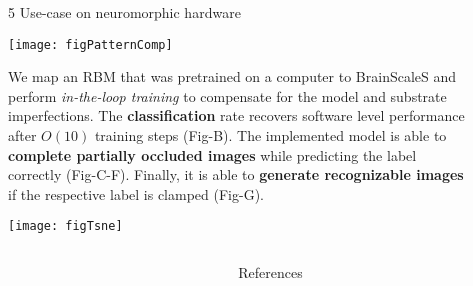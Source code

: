 \begin{frame}
\begin{columns}
\begin{column}{0.99\textwidth}
\begin{columns}[t]
\begin{column}{0.32\textwidth}
\begin{block}{\large 5 Use-case on neuromorphic hardware}
					\thirdBlockImSpace
					\begin{center}
						\texttt{[image: figPatternComp]}
					\end{center}
					\thirdBlockImSpace


					\begin{adjustwidth}{1.cm}{1.cm}
					\justify
					We map an RBM that was pretrained on a computer to BrainScaleS and perform \textit{in-the-loop training } to compensate for the model and substrate imperfections.
					The \textbf{classification} rate recovers software level performance after $O(10)$ training steps (Fig-B).
					The implemented model is able to \textbf{complete partially occluded images} while predicting the label correctly (Fig-C-F).
					Finally, it is able to \textbf{generate recognizable images} if the respective label is clamped (Fig-G).

					\end{adjustwidth}
					\thirdBlockImSpace
					\begin{center}
						\texttt{[image: figTsne]}
					\end{center}

					
					\blockSpaceTwo
					\end{block}


					\interBlockSpaceTwo




				\end{column}

				\begin{column}{.005\textwidth}\end{column}


			\end{columns}



		\end{column}
		\begin{column}{.005\textwidth}\end{column}
	\end{columns}

	\vspace{-1.0cm}

	\begin{columns}[t]
		\begin{column}{.01\textwidth}\end{column}

		\begin{column}{.98\textwidth}
			\begin{block}{References}
			 \begin{minipage}{0.79\linewidth}
								\tiny
								
								
			 \end{minipage}


\end{block}
\end{column}
\end{columns}
\end{frame}
